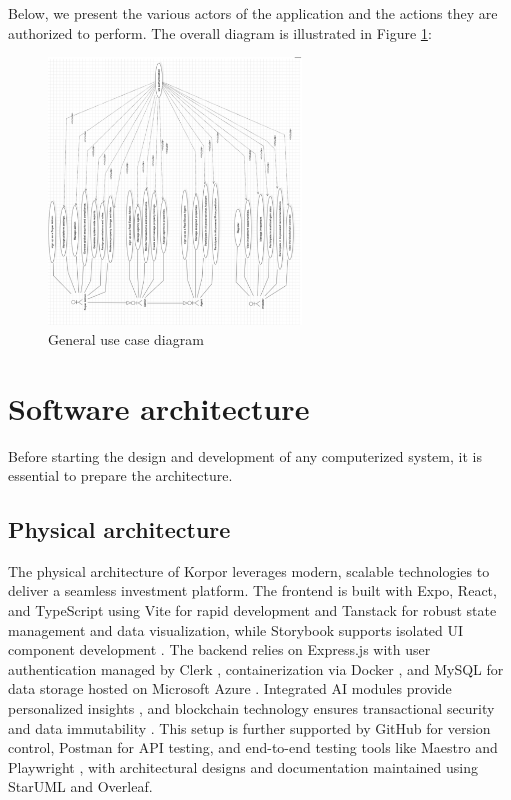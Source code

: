 Below, we present the various actors of the application and the actions they are authorized to perform.
The overall diagram is illustrated in Figure \ref{fig:use-case-diagram}:

\begin{figure}[htbp]
    \centering
    \includegraphics[width=0.6\textwidth]{images/diagram de case d utilisation general.png}
    \caption{General use case diagram}
    \label{fig:use-case-diagram}
\end{figure}
\newpage
\section{Software architecture}

Before starting the design and development of any computerized system, it is essential to prepare the architecture.

\subsection{Physical architecture}

 The physical architecture of Korpor leverages modern, scalable technologies to deliver a seamless investment platform. The frontend is built with Expo, React, and TypeScript using Vite \cite{ViteJSWebsite} for rapid development and Tanstack for robust state management and data visualization, while Storybook supports isolated UI component development \cite{StorybookDocs2022}. The backend relies on Express.js \cite{ExpressJSWebsite} with user authentication managed by Clerk \cite{ClerkAuthenticationDocs}, containerization via Docker \cite{DockerArchitecture2023}, and MySQL \cite{MySQLWebsite} for data storage hosted on Microsoft Azure \cite{AzureCloudServices2024}. Integrated AI modules provide personalized insights \cite{JohnsonAIPropertyValuation2024}, and blockchain technology ensures transactional security and data immutability \cite{WangBlockchainRealEstate2023, McKinseyBlockchainRE2023}. This setup is further supported by GitHub \cite{GithubWebsite} for version control, Postman \cite{PostmanWebsite} for API testing, and end-to-end testing tools like Maestro and Playwright \cite{PlaywrightDocs2023}, with architectural designs and documentation maintained using StarUML \cite{StarUMLWebsite} and Overleaf.

